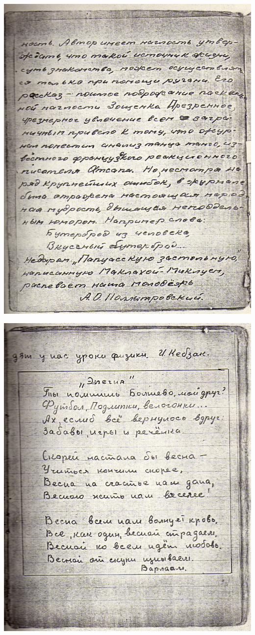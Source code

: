 \noindent
\includegraphics[width=\textwidth]{inc/Vynd/Vynd003}

\newpage


\noindent
\includegraphics[width=\textwidth]{inc/Vynd/Vynd004}

